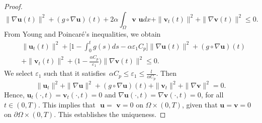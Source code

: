 \documentclass[10pt,a4paper]{amsart}
\numberwithin{equation}{section}
\begin{document}
\begin{proof}
\[ \| \nabla \mathbf{u}(t) \|^2 +(g\circ \nabla \mathbf{u})(t)
 +2 \alpha \int_\Omega \mathbf{v}\textbf{ u}dx
 +\| \mathbf{v}_{t} (t)\|^2 + \| \nabla \mathbf{v}(t) \|^2 \leq 0.
\]
 From Young and Poincar\'e's inequalities, we obtain
\begin{align*}
&\| \mathbf{u}_{t}(t) \| ^2+ \Big[ 1-\int_0^t g(s) ds
 -\alpha \varepsilon_{1} C_p \Big] \| \nabla \mathbf{u}(t) \|^2
 +(g\circ \nabla \mathbf{u})(t)\\
&+\| \mathbf{v}_{t}(t) \|^2 + \Big( 1-\frac{\alpha C_{p}}{\varepsilon_{1} }\Big)
\| \nabla \mathbf{v}(t) \|^2 \leq 0.
\end{align*}
We select $\varepsilon_{1}$ such that it satisfies\,
$\alpha C_p \leq \varepsilon_{1}\leq \frac{l}{\alpha C_p}$. Then
\[
 \| \mathbf{u}_{t} \|^2 + \| \nabla \mathbf{u} \|^2
 +(g\circ\nabla \mathbf{u})(t)+\| \mathbf{v}_{t} \|^2 + \| \nabla \mathbf{v} \|^2=0.
\]
Hence, \( \mathbf{u}_t(\cdot, t) = \mathbf{v}_t(\cdot, t) = 0 \) and
\( \nabla \mathbf{u}(\cdot, t) = \nabla\mathbf{v}(\cdot, t) = 0 \), for all
\( t \in (0, T) \). This implies that \( \textbf{ u} = \textbf{ v} = 0 \) on
\( \Omega \times (0, T) \), given that \( \mathbf{u} = \mathbf{v} = 0 \) on
\( \partial\Omega \times (0, T) \). This establishes the uniqueness.
\end{proof}
\end{document}
